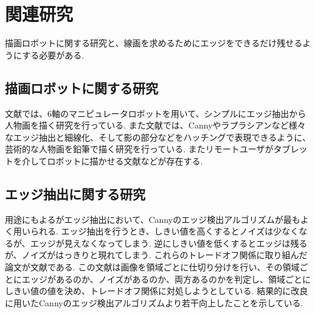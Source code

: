 \chapter{関連研究}
  \label{chap:related}
  
  描画ロボットに関する研究と、線画を求めるためにエッジをできるだけ残せるようにする必要がある.
	
  \section{描画ロボットに関する研究}
    \label{sec:related_reasearch}
	文献\cite{1}では、6軸のマニピュレータロボットを用いて、シンプルにエッジ抽出から人物画を描く研究を行っている.
	また文献\cite{2}では、Cannyやラプラシアンなど様々なエッジ抽出と細線化、そして影の部分などをハッチングで表現できるように、芸術的な人物画を鉛筆で描く研究を行っている. 
	またリモートユーザがタブレットを介してロボットに描かせる文献\cite{3}などが存在する.


  \section{エッジ抽出に関する研究}
    \label{sec:edged_detection_research}
	用途にもよるがエッジ抽出において、Cannyのエッジ検出アルゴリズムが最もよく用いられる.
	エッジ抽出を行うとき、しきい値を高くするとノイズは少なくなるが、エッジが見えなくなってしまう. 逆にしきい値を低くするとエッジは残るが、ノイズがはっきりと現れてしまう. これらのトレードオフ関係に取り組んだ論文が文献\cite{4}である. この文献は画像を領域ごとに仕切り分けを行い、その領域ごとにエッジがあるのか、ノイズがあるのか、両方あるのかを判定し、領域ごとにしきい値の値を決め、トレードオフ関係に対処しようとしている. 結果的に改良に用いたCannyのエッジ検出アルゴリズムより若干向上したことを示している.



